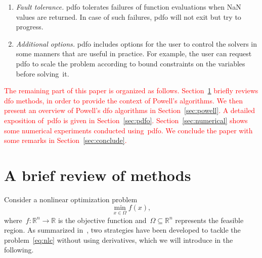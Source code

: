 \documentclass[
    smallextended,  %
    final,        %
]{svjour3}
\newcommand{\R}{\mathbb{R}}
\newcommand{\fset}{\Omega}
\newcommand{\obj}{f}
\newcommand{\red}{\textcolor{red}}
\begin{document}
\begin{enumerate}
    \item \emph{Fault tolerance.}
    \Gls{pdfo} tolerates failures of function evaluations when NaN values are returned.
    In case of such failures, \gls{pdfo} will not exit but try to progress.

    \item \emph{Additional options.}
    \Gls{pdfo} includes options for the user to control the solvers in some manners that are useful in practice.
    For example, the user can request \gls{pdfo} to scale the problem according to bound constraints on the variables before solving~it.
\end{enumerate}

\red{
The remaining part of this paper is organized as follows.
Section~\ref{sec:dfo} briefly reviews \gls{dfo} methods, in order to provide the context of Powell's algorithms.
We then present an overview of Powell's \gls{dfo} algorithms in Section~\ref{sec:powell}.
A detailed exposition of~\gls{pdfo} is given in Section~\ref{sec:pdfo}.
Section~\ref{sec:numerical} shows some numerical experiments conducted using~\gls{pdfo}.
We conclude the paper with some remarks in Section~\ref{sec:conclude}.
}

\section{A brief review of  methods}
\label{sec:dfo}

Consider a nonlinear optimization problem
\begin{equation}
    \label{eq:nlc}
    \min_{x \in \fset} \obj(x),
\end{equation}
where~$\obj : \R^n \to \R$ is the objective function and~$\fset \subseteq \R^n$ represents the feasible region.
As summarized in~\cite{Conn_Scheinberg_Vicente_2009b}, two strategies have been developed to tackle
the problem~\eqref{eq:nlc} without using derivatives, which we will introduce in the following.
\end{document}
